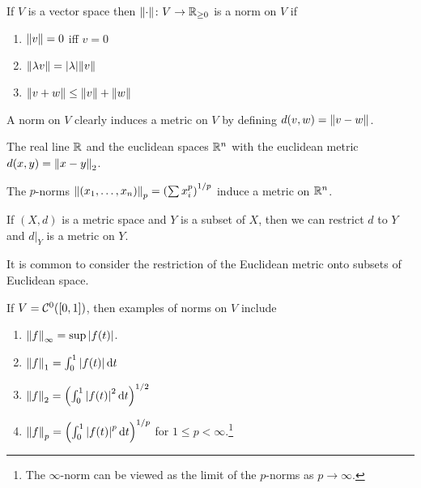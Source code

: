 \begin{definition}[Norm]
    If $V$ is a vector space then $\norm{\cdot}\colon V \to \mathbb R_{\ge 0}$ is a norm on $V$ if 
    \begin{enumerate}
        \item $\norm{v} = 0$ iff $v = 0$
        \item $\norm{\lambda v} = \abs{\lambda}\norm{v}$
        \item $\norm{v + w} \le \norm{v} + \norm{w}$
    \end{enumerate}
\end{definition}

A norm on $V$ clearly induces a metric on $V$ by defining $d(v, w) = \norm{v - w}$. 

\begin{example}
    The real line $\mathbb R$ and the euclidean spaces $\mathbb R^n$ with the euclidean metric $d(x, y) = \norm{x - y}_2$.
\end{example}

\begin{example}[$p$-norms]
    The $p$-norms $\norm{(x_1, \dots, x_n)}_p = \qty(\sum x_i^p)^{1/p}$ induce a metric on $\mathbb R^n$.
\end{example}

\begin{definition}
    If $(X, d)$ is a metric space and $Y$ is a subset of $X$, then we can restrict $d$ to $Y$ and $d\vert_Y$ is a metric on $Y$.
\end{definition}

It is common to consider the restriction of the Euclidean metric onto subsets of Euclidean space.

\begin{example}[$L^p$ norms]
    If $V = \mathcal C^0([0, 1])$, then examples of norms on $V$ include 
    \begin{enumerate}
        \item $\norm{f}_\infty = \sup{\abs{f(t)}}$.
        \item $\norm{f}_1 = \int_0^1 \abs{f(t)} \dd{t}$
        \item $\norm{f}_2 = \qty(\int_0^1 \abs{f(t)}^2 \dd{t})^{1/2}$
        \item $\norm{f}_p = \qty(\int_0^1 \abs{f(t)}^p \dd{t})^{1/p}$ for $1 \le p < \infty$.\footnote{The $\infty$-norm can be viewed as the limit of the $p$-norms as $p \to \infty$.}
    \end{enumerate}
\end{example}


